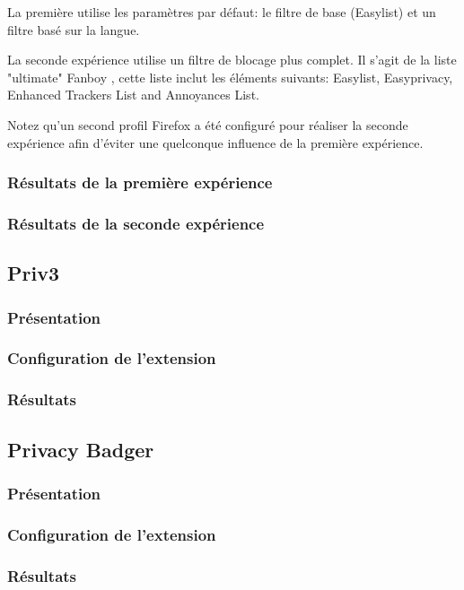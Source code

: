 La première utilise les paramètres par défaut: le filtre de base (Easylist) et un filtre basé sur la langue.

La seconde expérience utilise un filtre de blocage plus complet. Il s'agit de la liste "ultimate" Fanboy \cite{fanboy_filters}, cette liste inclut les éléments suivants: Easylist, Easyprivacy, Enhanced Trackers List and Annoyances List.

Notez qu'un second profil Firefox a été configuré pour réaliser la seconde expérience afin d'éviter une quelconque influence de la première expérience.

\subsubsection{Résultats de la première expérience}
\subsubsection{Résultats de la seconde expérience}

\subsection{Priv3}
\subsubsection{Présentation}
\subsubsection{Configuration de l'extension}
\subsubsection{Résultats}

\subsection{Privacy Badger}
\subsubsection{Présentation}
\subsubsection{Configuration de l'extension}
\subsubsection{Résultats}

